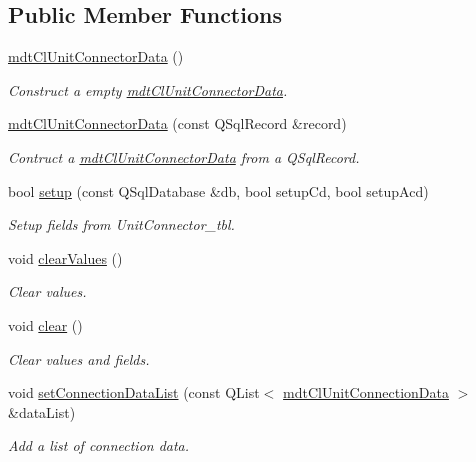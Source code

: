 \subsection*{Public Member Functions}
\begin{DoxyCompactItemize}
\item 
\hyperlink{classmdt_cl_unit_connector_data_a67140bc54965063f71d6f40d0a38ccca}{mdt\-Cl\-Unit\-Connector\-Data} ()
\begin{DoxyCompactList}\small\item\em Construct a empty \hyperlink{classmdt_cl_unit_connector_data}{mdt\-Cl\-Unit\-Connector\-Data}. \end{DoxyCompactList}\item 
\hyperlink{classmdt_cl_unit_connector_data_af70e73e59544ed4282fb10567634b4f4}{mdt\-Cl\-Unit\-Connector\-Data} (const Q\-Sql\-Record \&record)
\begin{DoxyCompactList}\small\item\em Contruct a \hyperlink{classmdt_cl_unit_connector_data}{mdt\-Cl\-Unit\-Connector\-Data} from a Q\-Sql\-Record. \end{DoxyCompactList}\item 
bool \hyperlink{classmdt_cl_unit_connector_data_a16e730eedccb32a198987ce26d4aa524}{setup} (const Q\-Sql\-Database \&db, bool setup\-Cd, bool setup\-Acd)
\begin{DoxyCompactList}\small\item\em Setup fields from Unit\-Connector\-\_\-tbl. \end{DoxyCompactList}\item 
void \hyperlink{classmdt_cl_unit_connector_data_a77be8b03d9cc6711aa30c4770fea4419}{clear\-Values} ()
\begin{DoxyCompactList}\small\item\em Clear values. \end{DoxyCompactList}\item 
void \hyperlink{classmdt_cl_unit_connector_data_a55918c459b5d4c67bbe12cffe9d006df}{clear} ()
\begin{DoxyCompactList}\small\item\em Clear values and fields. \end{DoxyCompactList}\item 
void \hyperlink{classmdt_cl_unit_connector_data_a46f01384d0310957841721f4d4f8d0e9}{set\-Connection\-Data\-List} (const Q\-List$<$ \hyperlink{classmdt_cl_unit_connection_data}{mdt\-Cl\-Unit\-Connection\-Data} $>$ \&data\-List)
\begin{DoxyCompactList}\small\item\em Add a list of connection data. \end{DoxyCompactList}\item 

\end{DoxyCompactItemize}
